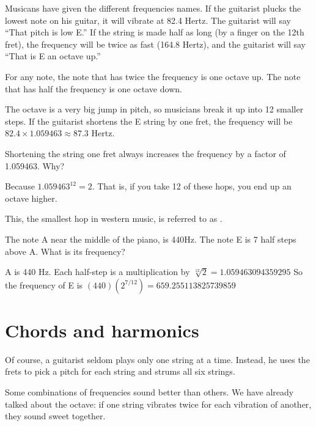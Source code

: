 Musicans have given the different frequencies names. If the guitarist
plucks the lowest note on his guitar, it will vibrate at 82.4
Hertz. The guitarist will say ``That pitch is low E.'' If the string is made
half as long (by a finger on the 12th fret), the frequency will be
twice as fast (164.8 Hertz), and the guitarist will say ``That is E an
octave up.''

For any note, the note that has twice the frequency is one octave
up. The note that has half the frequency is one octave down.

The octave is a very big jump in pitch, so musicians break it up into
12 smaller steps. If the guitarist shortens the E string by one fret,
the frequency will be $82.4 \times 1.059463 \approx 87.3$ Hertz. 

Shortening the string one fret always increases the frequency by a factor of 1.059463. Why?

Because $1.059463^12 = 2$. That is, if you take 12 of these hops, you
end up an octave higher.

This, the smallest hop in western music, is referred to as .

\begin{Exercise}[title={Notes and frequecies}, label=note_to_frequency]

The note A near the middle of the piano, is 440Hz. The note E is 7 half steps above A.  What is its frequency?
 
\end{Exercise}
\begin{Answer}[ref=note_to_frequency]

  A is 440 Hz.  Each half-step is a multiplication by $\sqrt[12]{2} = 1.059463094359295$
  So the frequency of E is $(440)(2^{7/12}) = 659.255113825739859$

\end{Answer}


\section{Chords and harmonics}

Of course, a guitarist seldom plays only one string at a
time. Instead, he uses the frets to pick a pitch for each string and
strums all six strings.

Some combinations of frequencies sound better than others. We have
already talked about the octave: if one string vibrates twice for each
vibration of another, they sound sweet together.

